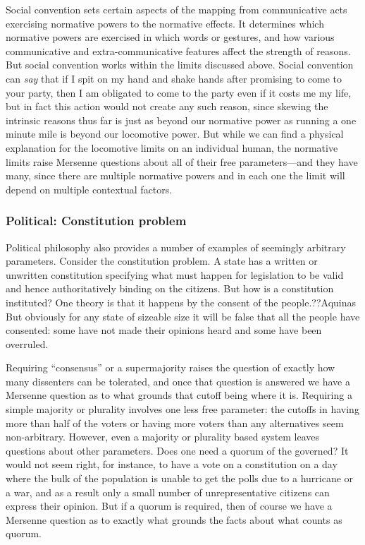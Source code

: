 Social convention sets certain aspects of the mapping from communicative acts exercising normative powers to the normative
effects. It determines which normative powers are exercised in which words or gestures, and how various communicative and
extra-communicative features affect the strength of reasons. But social convention works within the limits discussed
above. Social convention can \textit{say} that if I spit on my hand and shake hands after promising to come to your
party, then I am obligated to come to the party even if it costs me my life, but in fact this action would not create
any such reason, since skewing the intrinsic reasons thus far is just as beyond our normative power as running a one minute
mile is beyond our locomotive power. But while we can find a physical explanation for the locomotive limits on an 
individual human, the normative limits raise Mersenne questions about all of their free parameters---and they have many,
since there are multiple normative powers and in each one the limit will depend on multiple contextual factors.

\subsubsection{Political: Constitution problem}
Political philosophy also provides a number of examples of seemingly arbitrary parameters. Consider the constitution problem. A state has a written or unwritten
constitution specifying what must happen for legislation to be valid and hence authoritatively binding on the citizens. But 
how is a constitution instituted? One theory is that it happens by the consent of the people.??Aquinas But obviously for any state
of sizeable size it will be false that all the people have consented: some have not made their opinions heard and some have been
overruled. 

Requiring ``consensus'' or a supermajority raises the question of exactly how many dissenters can be tolerated, and
once that question is answered we have a Mersenne question as to what grounds that cutoff being where it is. Requiring a simple
majority or plurality involves one less free parameter: the cutoffs in having more than half of the voters or having more voters
than any alternatives seem non-arbitrary. However, even a majority or plurality based system leaves questions about other parameters.
Does one need a quorum of the governed? It would not seem right, for instance, to have a vote on a constitution on a day 
where the bulk of the population is unable to get the polls due to a hurricane or a war, and as a result only a small number of
unrepresentative citizens can express their opinion. But if a quorum is required, then of course we have a Mersenne question
as to exactly what grounds the facts about what counts as quorum.

